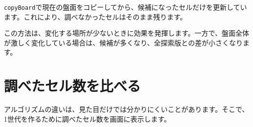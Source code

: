 \begin{listing}[htbp]
\inputminted[firstline=38,lastline=83]{ts}{typescript-p5/listings/chapter18/life-game-optimized.ts}
\caption{差分更新版で使う候補リストの補助関数（\texttt{chapter18/life-game-optimized.ts}）}
\label{lst:chapter18-optimized-candidates}
\end{listing}

\begin{listing}[htbp]
\inputminted[firstline=85,lastline=119]{ts}{typescript-p5/listings/chapter18/life-game-optimized.ts}
\caption{変化した周囲だけを調べて次の世代を作る（\texttt{chapter18/life-game-optimized.ts}）}
\label{lst:chapter18-optimized-update}
\end{listing}

\begin{listing}[htbp]
\inputminted[firstline=121,lastline=141]{ts}{typescript-p5/listings/chapter18/life-game-optimized.ts}
\caption{変化したセルの周囲を候補に加える（\texttt{chapter18/life-game-optimized.ts}）}
\label{lst:chapter18-optimized-around-cells}
\end{listing}

\begin{listing}[htbp]
\inputminted[firstline=251,lastline=289]{ts}{typescript-p5/listings/chapter18/life-game-optimized.ts}
\caption{差分更新版のLife Gameを動かす（\texttt{chapter18/life-game-optimized.ts}）}
\label{lst:chapter18-optimized-sketch}
\end{listing}

\texttt{copyBoard}で現在の盤面をコピーしてから、候補になったセルだけを更新しています。これにより、調べなかったセルはそのまま残ります。

この方法は、変化する場所が少ないときに効果を発揮します。一方で、盤面全体が激しく変化している場合は、候補が多くなり、全探索版との差が小さくなります。

\section{調べたセル数を比べる}

アルゴリズムの違いは、見た目だけでは分かりにくいことがあります。そこで、1世代を作るために調べたセル数を画面に表示します。

\begin{listing}[htbp]
\inputminted[firstline=1,lastline=36]{ts}{typescript-p5/listings/chapter18/life-game-comparison.ts}
\caption{比較用サンプルで使う位置と結果のクラス（\texttt{chapter18/life-game-comparison.ts}）}
\label{lst:chapter18-comparison-classes}
\end{listing}

